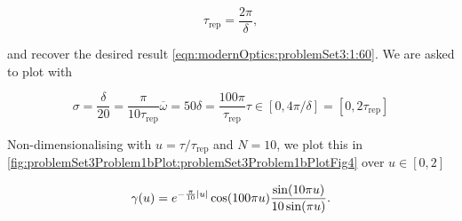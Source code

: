 {\begin{dmath}\label{eqn:modernOptics:problemSet3:1:620}
\tau_{\mathrm{rep}} = \frac{2 \pi}{\delta},
\end{dmath}

and recover the desired result \ref{eqn:modernOptics:problemSet3:1:60}.  We are asked to plot with

\begin{subequations}
\begin{equation}\label{eqn:modernOptics:problemSet3:1:640}
\sigma = \frac{\delta}{20} = \frac{\pi}{10 \tau_{\mathrm{rep}}}
\end{equation}
\begin{equation}\label{eqn:modernOptics:problemSet3:1:660}
\overbar{\omega} = 50 \delta = \frac{100 \pi}{\tau_{\mathrm{rep}}}
\end{equation}
\begin{equation}\label{eqn:modernOptics:problemSet3:1:680}
\tau \in [0, 4 \pi/\delta] = [0, 2 \tau_{\mathrm{rep}}]
\end{equation}
\end{subequations}

Non-dimensionalising with $u = \tau/\tau_{\mathrm{rep}}$ and $N = 10$, we plot this in \cref{fig:problemSet3Problem1bPlot:problemSet3Problem1bPlotFig4} over $u \in [0, 2]$

\begin{dmath}\label{eqn:modernOptics:problemSet3:1:700}
\gamma(u) 
=
e^{ -\frac{\pi}{10} \Abs{u} }
\cos( 100 \pi u )
\frac{
\sin( 10 \pi u )
}
{
10 \sin( \pi u )
}.
\end{dmath}

}
